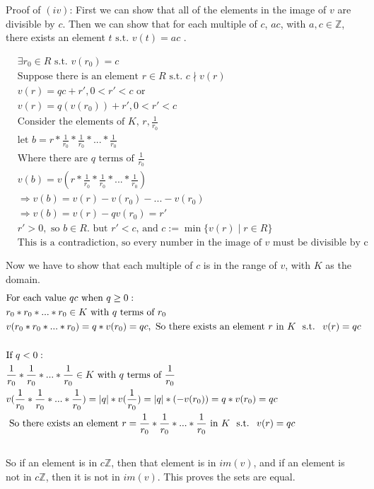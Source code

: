 \documentclass[11pt]{article}
\newcommand{\B}[1]{%
	\mathbb{#1}
}
\newcommand{\st}{
	\text{ s.t. }
}
\begin{document}
{Proof of $(iv)$:
\newline
First we can show that all of the elements in the image of $v$ are divisible by $c$. Then we can show that for each multiple of $c$, $ac$, with $a, c \in \B{Z}$, there exists an element $t \st v(t) = ac$ .

\begin{align*}
&\exists r_0 \in R \st v(r_0) = c\\
&\text{Suppose there is an element $r \in R \st c \nmid v(r)$}\\
&v(r) = qc + r', 0 < r' < c \text{ or}\\
&v(r) = q(v(r_0)) + r', 0 < r' < c\\
&\text{Consider the elements of $K$, $r, \frac{1}{r_0}$}\\
&\text{let } b = r * \frac{1}{r_0} * \frac{1}{r_0} * ... * \frac{1}{r_0}\\
&\text{Where there are $q$ terms of $\frac{1}{r_0}$}\\
&v(b) = v(r * \frac{1}{r_0} * \frac{1}{r_0} * ... * \frac{1}{r_0})\\
&\Rightarrow v(b) = v(r) - v(r_0) - ... - v(r_0)\\
&\Rightarrow v(b) = v(r) - qv(r_0) = r'\\
&r' > 0, \text{ so } b \in R. \text{ but $r' < c$, and $c := \min \{v(r) \mid r \in R$\}}\\
&\text{This is a contradiction, so every number in the image of $v$ must be divisible by c}\\
&\\
\end{align*}
Now we have to show that each multiple of $c$ is in the range of $v$, with $K$ as the domain.
\begin{align*}
&\text{For each value $qc$ when $q \geq 0$}:\\
&r_0*r_0*...*r_0 \in K \text{ with $q$ terms of $r_0$}\\
&v(r_0*r_0*...*r_0) = q*v(r_0) = qc, \text{ So there exists an element $r$ in $K$ \st $v(r) = qc$}\\
&\\
&\text{If $q < 0$}:\\
&\frac{1}{r_0}*\frac{1}{r_0}*...*\frac{1}{r_0} \in K \text{ with $q$ terms of $\frac{1}{r_0}$}\\
&v(\frac{1}{r_0}*\frac{1}{r_0}*...*\frac{1}{r_0}) = \vert q \vert *v(\frac{1}{r_0}) = \vert q \vert * (-v(r_0)) = q*v(r_0) = qc\\
&\text{ So there exists an element $r = \frac{1}{r_0}*\frac{1}{r_0}*...*\frac{1}{r_0}$ in $K$ \st $v(r) = qc$}\\
&\\
\end{align*}
So if an element is in $c \B{Z} $, then that element is in $im(v)$, and if an element is not in $c\B{Z}$, then it is not in $im(v)$. This proves the sets are equal.


}
\end{document}
